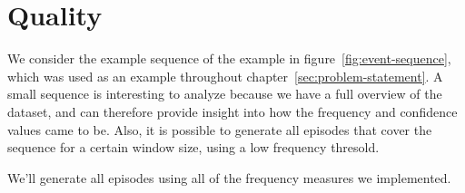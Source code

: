 
\section{Quality}

We consider the example sequence of the example in figure~\ref{fig:event-sequence}, which was used as an example throughout chapter~\ref{sec:problem-statement}. A small sequence is interesting to analyze because we have a full overview of the dataset, and can therefore provide insight into how the frequency and confidence values came to be. Also, it is possible to generate all episodes that cover the sequence for a certain window size, using a low frequency thresold.

We'll generate all episodes using all of the frequency measures we implemented.

\begin{table}

\begin{tabulary}{\textwidth}{ L|R|R|R }



\end{tabulary}

\end{table}
